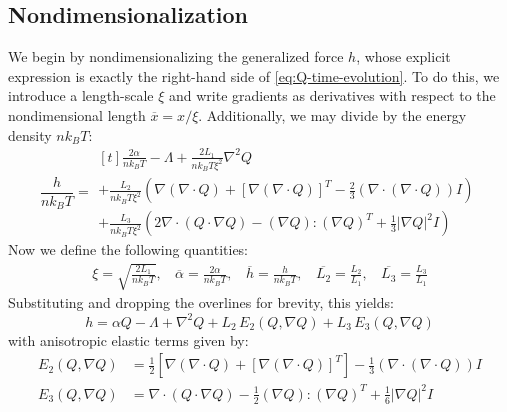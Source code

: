\documentclass[reqno]{article}
\begin{document}
  \subsection{Nondimensionalization}
  We begin by nondimensionalizing the generalized force $h$, whose explicit
  expression is exactly the right-hand side of \eqref{eq:Q-time-evolution}.
  To do this, we introduce a length-scale $\xi$ and write gradients as
  derivatives with respect to the nondimensional length $\overline{x} = x /
  \xi$.
  Additionally, we may divide by the energy density $n k_B T$:
  \begin{equation}
    \frac{h}{n k_B T}
    =
    \begin{multlined}[t]
      \frac{2 \alpha}{n k_B T}
      - \Lambda
      + \frac{2 L_1}{n k_B T \xi^2} \nabla^2 Q  \\
      + \frac{L_2}{n k_B T \xi^2} \left(
        \nabla \left( \nabla \cdot Q \right)
        + \left[ \nabla \left( \nabla \cdot Q \right) \right]^T
        - \tfrac23 \left( \nabla \cdot \left( \nabla \cdot Q \right) \right) I
      \right) \\
      + \frac{L_3}{n k_B T \xi^2} \left(
        2 \nabla \cdot \left( Q \cdot \nabla Q \right)
        - \left( \nabla Q \right) : \left( \nabla Q \right)^T
        + \tfrac13 \left| \nabla Q \right|^2 I
      \right)
    \end{multlined}
  \end{equation}
  Now we define the following quantities:
  \begin{equation}
    \begin{split}
      \xi = \sqrt{\frac{2 L_1}{n k_B T}}, \:\:\:\:
      \overline{\alpha} = \frac{2 \alpha}{n k_B T}, \:\:\:\:
      \overline{h} = \frac{h}{n k_B T}, \:\:\:\:
      \overline{L_2} = \frac{L_2}{L_1}, \:\:\:\:
      \overline{L_3} = \frac{L_3}{L_1}
    \end{split}
  \end{equation}
  Substituting and dropping the overlines for brevity, this yields:
  \begin{equation}
    h
    =
    \alpha Q
    - \Lambda
    + \nabla^2 Q 
    + L_2 \, E_2 (Q, \nabla Q) 
    + L_3 \, E_3 (Q, \nabla Q)
  \end{equation}
  with anisotropic elastic terms given by:
  \begin{align}
    E_2 (Q, \nabla Q)
    &=
    \tfrac12 \left[
    \nabla \left( \nabla \cdot Q \right)
    + \left[ \nabla \left( \nabla \cdot Q \right) \right]^T
    \right]
    - \tfrac13 \left( \nabla \cdot \left( \nabla \cdot Q \right) \right) I \\
    E_3(Q, \nabla Q)
    &=
    \nabla \cdot \left( Q \cdot \nabla Q \right)
    - \tfrac12 \left( \nabla Q \right) :  \left( \nabla Q \right)^T
    + \tfrac16 \left| \nabla Q \right|^2 I
  \end{align}
\end{document}
